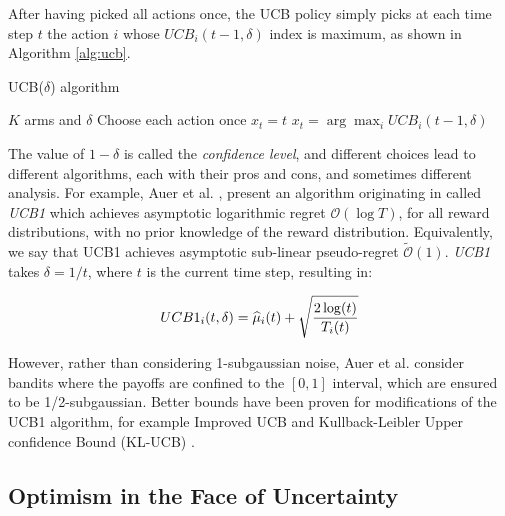 After having picked all actions once, the \gls{UCB} policy simply picks at each time step $t$ the action $i$ whose $UCB_i(t-1,\delta)$ index is maximum, as shown in Algorithm \ref{alg:ucb}.

\begin{algorithm}[t]
	\caption{\gls{UCB}($\delta$) algorithm}
	\label{alg:ucb}
	\begin{algorithmic}[1]
	 $K$ arms and $\delta$
	\State Choose each action once
			\State $x_{t} = t$
		\Else
			\State $x_t = \arg\max_i UCB_i(t-1, \delta)$
		\EndIf
	\EndFor
	\end{algorithmic}
\end{algorithm}


The value of $1-\delta$ is called the \emph{confidence level}, and different choices lead to different algorithms, each with their pros and cons, and sometimes different analysis. For example, Auer et al. \cite{auer2002finite}, present an algorithm originating in \cite{agrawal1995continuum} called \emph{UCB1} which achieves asymptotic logarithmic regret $\mathcal{O}(\log{T})$, for all reward distributions, with no prior knowledge of the reward distribution. Equivalently, we say that UCB1 achieves asymptotic sub-linear pseudo-regret $\widetilde{\mathcal{O}}(1)$. \emph{UCB1} takes $\delta=1/t$, where $t$ is the current time step, resulting in:

\begin{align}
UCB1_i(t, \delta) = \widehat{\mu}_i(t) + \sqrt{\frac{2\log(t)}{T_i(t)}}
\end{align}

However, rather than considering 1-subgaussian noise, Auer et al. \cite{auer2002finite} consider bandits where the payoffs are confined to the $[0,1]$ interval, which are ensured to be 1/2-subgaussian. Better bounds have been proven for modifications of the UCB1 algorithm, for example Improved UCB \cite{auer2010ucb} and Kullback-Leibler Upper confidence Bound (KL-UCB) \cite{garivier2011kl}.

\subsection{Optimism in the Face of Uncertainty}


